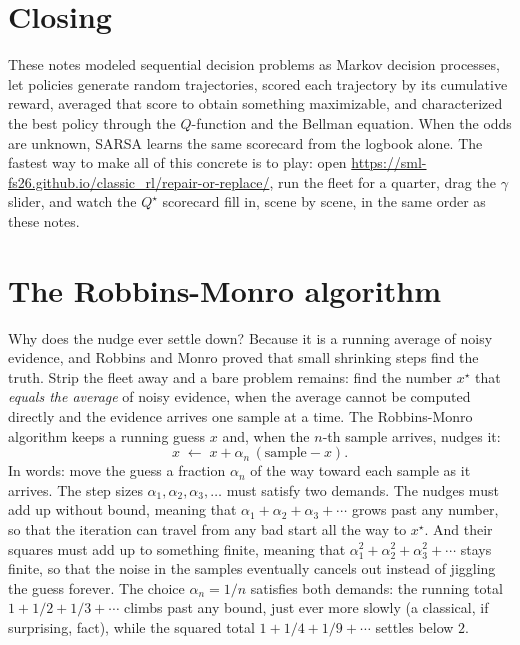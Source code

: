 \documentclass[11pt,a4paper]{article}
\theoremstyle{definition}
\theoremstyle{remark}
\numberwithin{equation}{section}
\newcommand{\vizurl}{\url{https://sml-fs26.github.io/classic_rl/repair-or-replace/}}
\begin{document}
\section*{Closing}

These notes modeled sequential decision problems as Markov decision processes, let policies
generate random trajectories, scored each trajectory by its cumulative reward, averaged that
score to obtain something maximizable, and characterized the best policy through the
$Q$-function and the Bellman equation. When the odds are unknown, SARSA learns the same
scorecard from the logbook alone. The fastest way to make all of this concrete is to
play: open \vizurl, run the fleet for a quarter, drag the $\gamma$ slider, and watch the
$Q^\star$ scorecard fill in, scene by scene, in the same order as these notes.

\appendix

\section{The Robbins-Monro algorithm}\label{app:rm}

Why does the nudge ever settle down? Because it is a running average of noisy evidence, and
Robbins and Monro proved that small shrinking steps find the truth. Strip the fleet away and a
bare problem remains: find the number $x^\star$ that
\emph{equals the average} of noisy evidence, when the average cannot be computed directly
and the evidence arrives one sample at a time. The Robbins-Monro algorithm keeps a running
guess $x$ and, when the $n$-th sample arrives, nudges it:
\[
x \;\leftarrow\; x + \alpha_n\,(\text{sample} - x).
\]
In words: move the guess a fraction $\alpha_n$ of the way toward each sample as it
arrives. The step sizes $\alpha_1, \alpha_2, \alpha_3, \dots$ must satisfy two demands.
The nudges must add up without bound, meaning that
$\alpha_1 + \alpha_2 + \alpha_3 + \cdots$ grows past any number, so that the iteration can
travel from any bad start all the way to $x^\star$. And their squares must add up to
something finite, meaning that $\alpha_1^2 + \alpha_2^2 + \alpha_3^2 + \cdots$ stays
finite, so that the noise in the samples eventually cancels out instead of jiggling the
guess forever. The choice $\alpha_n = 1/n$ satisfies both demands: the running total
$1 + 1/2 + 1/3 + \cdots$ climbs past any bound, just ever more slowly (a classical, if
surprising, fact), while the squared total $1 + 1/4 + 1/9 + \cdots$ settles below $2$.
\end{document}
